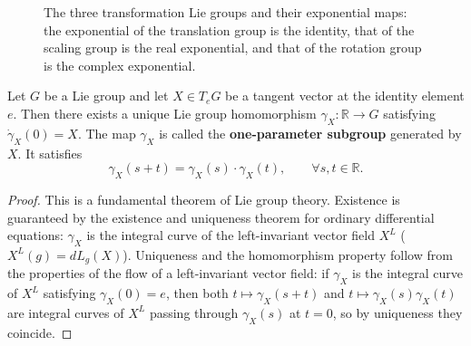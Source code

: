 \begin{figure}[htbp]
\centering
{}
\caption{The three transformation Lie groups and their exponential maps: the exponential of the translation group is the identity, that of the scaling group is the real exponential, and that of the rotation group is the complex exponential.}
\label{fig:lie_groups}
\end{figure}

\begin{proposition}\label{prop:one_parameter_subgroup}
Let $G$ be a Lie group and let $X \in T_eG$ be a tangent vector at the identity element $e$. Then there exists a unique Lie group homomorphism $\gamma_X: \mathbb{R} \to G$ satisfying $\dot{\gamma}_X(0) = X$. The map $\gamma_X$ is called the \textbf{one-parameter subgroup} generated by $X$. It satisfies
\[
\gamma_X(s + t) = \gamma_X(s) \cdot \gamma_X(t), \qquad \forall s, t \in \mathbb{R}.
\]
\end{proposition}

\begin{proof}
This is a fundamental theorem of Lie group theory. Existence is guaranteed by the existence and uniqueness theorem for ordinary differential equations: $\gamma_X$ is the integral curve of the left-invariant vector field $X^L$ ($X^L(g) = dL_g(X)$). Uniqueness and the homomorphism property follow from the properties of the flow of a left-invariant vector field: if $\gamma_X$ is the integral curve of $X^L$ satisfying $\gamma_X(0) = e$, then both $t \mapsto \gamma_X(s+t)$ and $t \mapsto \gamma_X(s)\gamma_X(t)$ are integral curves of $X^L$ passing through $\gamma_X(s)$ at $t=0$, so by uniqueness they coincide.
\end{proof}

